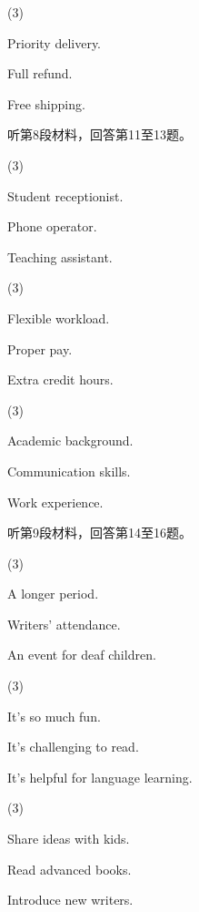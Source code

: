 \documentclass{英语试卷}
\begin{document}
\begin{choices}(3)
  \item Priority delivery.
  \item Full refund.
  \item Free shipping.
\end{choices}
\par 听第8段材料，回答第11至13题。\par
{}
\begin{choices}(3)
  \item Student receptionist.
  \item Phone operator.
  \item Teaching assistant.
\end{choices}
\begin{choices}(3)
  \item Flexible workload.
  \item Proper pay.
  \item Extra credit hours.
\end{choices}
\begin{choices}(3)
  \item Academic background.
  \item Communication skills.
  \item Work experience.
\end{choices}
\par 听第9段材料，回答第14至16题。\par
{}
\begin{choices}(3)
  \item A longer period.
  \item Writers' attendance.
  \item An event for deaf children.
\end{choices}
\begin{choices}(3)
  \item It's so much fun.
  \item It's challenging to read.
  \item It's helpful for language learning.
\end{choices}
\begin{choices}(3)
  \item Share ideas with kids.
  \item Read advanced books.
  \item Introduce new writers.
\end{choices}
\end{document}
